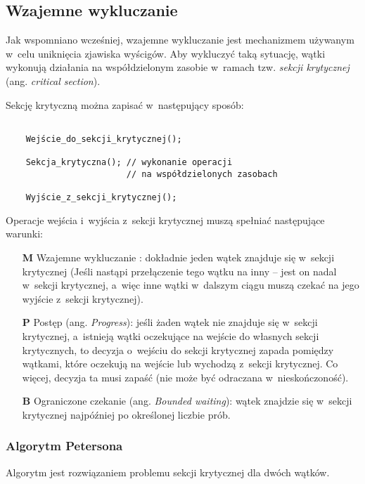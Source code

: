 \documentclass{mwart}
\begin{document}
\subsection{Wzajemne wykluczanie}
%
\indent
	Jak wspomniano wcześniej, wzajemne wykluczanie jest mechanizmem używanym w~celu uniknięcia zjawiska wyścigów.
	Aby wykluczyć taką sytuację, wątki wykonują działania na współdzielonym zasobie w~ramach tzw. \emph{sekcji krytycznej}
	(ang. \emph{critical section}).
\par
%
\indent
	Sekcję krytyczną można zapisać w~następujący sposób:
	\begin{verbatim}

    Wejście_do_sekcji_krytycznej();

    Sekcja_krytyczna(); // wykonanie operacji
                        // na współdzielonych zasobach

    Wyjście_z_sekcji_krytycznej();
	\end{verbatim}
	
	Operacje wejścia i~wyjścia z~sekcji krytycznej muszą spełniać następujące warunki:
	\begin{itemize}
	\item[{\bf M}] Wzajemne wykluczanie : dokładnie jeden wątek znajduje się w~sekcji krytycznej
	(Jeśli nastąpi przełączenie tego wątku na inny -- jest on nadal w~sekcji krytycznej, a~więc inne wątki
	w~dalszym ciągu muszą czekać na jego wyjście z~sekcji krytycznej).
	\item[{\bf P}] Postęp (ang. \emph{Progress}): jeśli żaden wątek nie znajduje się w~sekcji krytycznej, a~istnieją wątki oczekujące na wejście
	do własnych sekcji krytycznych, to decyzja o~wejściu do sekcji krytycznej zapada pomiędzy wątkami, które oczekują na wejście
	lub wychodzą z~sekcji krytycznej. Co więcej, decyzja ta musi zapaść (nie może być odraczana w~nieskończoność).
	\item[{\bf B}] Ograniczone czekanie (ang. \emph{Bounded waiting}): wątek znajdzie się w~sekcji krytycznej najpóźniej po określonej
	liczbie prób.
	\end{itemize}
\par
\subsubsection{Algorytm Petersona}
%
\indent
	Algorytm jest rozwiązaniem problemu sekcji krytycznej dla dwóch wątków. 
\par


%
%
%
%
%
%
%
%
%
%
%
%
%
\end{document}
